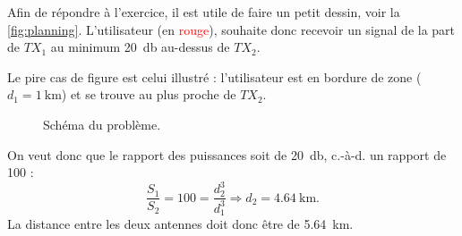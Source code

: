 \documentclass [a4paper, 11pt] {article}
\begin{document}
    \begin{reponse}
        Afin de répondre à l'exercice, il est utile de faire un petit dessin, voir la \autoref{fig:planning}. L'utilisateur (en \textcolor{red}{rouge}), souhaite donc recevoir un signal de la part de $TX_1$ au minimum \SI{20}{\decibel} au-dessus de $TX_2$.
        
        Le pire cas de figure est celui illustré : l'utilisateur est en bordure de zone ($d_1=\SI{1}{\kilo\meter}$) et se trouve au plus proche de $TX_2$.
        \begin{figure}[H]
            \centering
            \caption{Schéma du problème.}
            \label{fig:planning}
        \end{figure}
        
        On veut donc que le rapport des puissances soit de \SI{20}{\decibel}, c.-à-d. un rapport de 100 :
        \begin{equation}
            \frac{S_1}{S_2} = 100 = \frac{d_2^3}{d_1^3} \Rightarrow d_2 = \SI{4.64}{\kilo\meter}.
        \end{equation}
        La distance entre les deux antennes doit donc être de \SI{5.64}{\kilo\meter}.
        
    \end{reponse}
\end{document}
